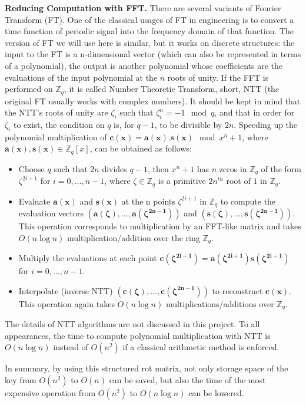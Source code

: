\begin{description}
  \textbf{Reducing Computation with FFT.} There are several variants of Fourier
  Transform (FT). One of the classical usages of FT in engineering is to convert
  a time function of periodic signal into the frequency domain of that
  function. The version of FT we will use here is similar, but it works on
  discrete structures: the input to the FT is a n-dimensional vector (which can
  also be represented in terms of a polynomial), the output is another
  polynomial whose coefficients are the evaluations of the input polynomial at
  the $n$ roots of unity.  If the FFT is performed on $\mathbb{Z}_q$, it is called
  Number Theoretic Transform, short, NTT (the original FT usually works with complex
  numbers). It should be kept in mind that the NTT's roots of unity are $\zeta_i$ such that
  $\zeta_i^n = -1\mod q$, and that in order for $\zeta_i$ to exist, the condition on
  $q$ is, for $q -1$, to be divisible by $2n$.  Speeding up the polynomial multiplication of
  $\mathbf{c(x) = a(x).s(x)} \mod x^n +1$, where $\mathbf{a(x),s(x)} \in \mathbb{Z}_q[x]$, can be obtained as follows:
  \begin{itemize}
  \item Choose $q$ such that $2n$ divides $q-1$, then $x^n + 1$ has $n$ zeros in
    $\mathbb{Z}_q$ of the form $\zeta^{2i + 1}$ for $i = 0,\dots,n-1$, where
    $\zeta \in \mathbb{Z}_q$ is a primitive $2n^{th}$ root of $1$ in
    $\mathbb{Z}_q$.
  \item Evaluate $\mathbf{a(x)}$ and $\mathbf{s(x)}$ at the n points
    $\zeta^{2i + 1}$ in $\mathbb{Z}_q$ to compute the evaluation vectors
    $\mathbf{(a(\zeta),\dots,a(\zeta^{2n-1}))}$ and
    $\mathbf{(s(\zeta), \dots, s(\zeta^{2n - 1}))}$. This operation corresponds
    to multiplication by an FFT-like matrix and takes $O(n \log n)$
    multiplication/addition over the ring $\mathbb{Z}_q$.
  \item Multiply the evaluations at each point
    $\mathbf{c(\zeta^{2i + 1}) = a(\zeta^{2i+1})s(\zeta^{2i+1})}$ for
    $i = 0,\dots,n-1$.
  \item Interpolate (inverse NTT) $\mathbf{(c(\zeta), \dots, c(\zeta^{2n-1}))}$
    to reconstruct $\mathbf{c(x)}$. This operation again takes $O(n\log n)$
    multiplications/additions over $\mathbb{Z}_q$.
  \end{itemize}
  The details of NTT algorithms are not discussed in this project. To all appearances,
  the time to compute polynomial multiplication with NTT is $O(n \log n)$
  instead of $O(n^2)$ if a classical arithmetic method is enforced.

  In summary, by using this structured rot matrix, not only storage space of the key from $O(n^2)$ to $O(n)$ can be saved, but also the time of the most expensive
  operation from $O(n^2)$ to $O(n\log n)$ can be lowered.
\end{description}

